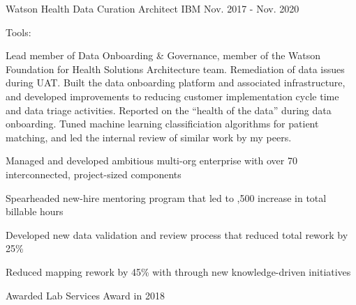 \begin{cventries}
  \cvexpentry
    {Watson Health} %
    {Data Curation Architect} %
    {IBM}
    {Nov. 2017 - Nov. 2020}
    {
      \begin{cvheavyparagraph}
        Tools:
      \end{cvheavyparagraph}
    }
    {
      \begin{cvparagraph}
        Lead member of Data Onboarding \& Governance, member of the Watson Foundation for Health Solutions Architecture team.  Remediation of data issues during UAT.  Built the data onboarding platform and associated infrastructure, and developed improvements to reducing customer implementation cycle time and data triage activities.  Reported on the “health of the data” during data onboarding.  Tuned machine learning classificiation algorithms for patient matching, and led the internal review of similar work by my peers.
      \end{cvparagraph}
      \begin{cvitems} %
        \item {Managed and developed ambitious multi-org enterprise with over 70 interconnected, project-sized components}
        \item {Spearheaded new-hire mentoring program that led to ,500 increase in total billable hours}
        \item {Developed new data validation and review process that reduced total rework by 25\%}
        \item {Reduced mapping rework by 45\% with through new knowledge-driven initiatives}
        \item {Awarded Lab Services Award in 2018}
      \end{cvitems}
    }


\end{cventries}
